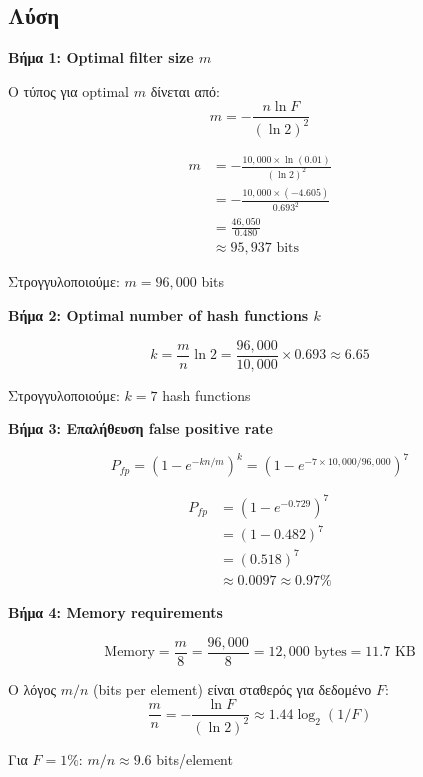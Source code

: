 \subsection*{Λύση}

\textbf{Βήμα 1: Optimal filter size $m$}

Ο τύπος για optimal $m$ δίνεται από:
$$m = -\frac{n \ln F}{(\ln 2)^2}$$

\begin{align*}
m &= -\frac{10{,}000 \times \ln(0.01)}{(\ln 2)^2} \\
&= -\frac{10{,}000 \times (-4.605)}{0.693^2} \\
&= \frac{46{,}050}{0.480} \\
&\approx 95{,}937 \text{ bits}
\end{align*}

Στρογγυλοποιούμε: $m = 96{,}000$ bits

\textbf{Βήμα 2: Optimal number of hash functions $k$}

$$k = \frac{m}{n} \ln 2 = \frac{96{,}000}{10{,}000} \times 0.693 \approx 6.65$$

Στρογγυλοποιούμε: $k = 7$ hash functions

\textbf{Βήμα 3: Επαλήθευση false positive rate}

$$P_{fp} = \left(1 - e^{-kn/m}\right)^k = \left(1 - e^{-7 \times 10{,}000 / 96{,}000}\right)^7$$

\begin{align*}
P_{fp} &= \left(1 - e^{-0.729}\right)^7 \\
&= (1 - 0.482)^7 \\
&= (0.518)^7 \\
&\approx 0.0097 \approx 0.97\%
\end{align*}

\textbf{Βήμα 4: Memory requirements}

$$\text{Memory} = \frac{m}{8} = \frac{96{,}000}{8} = 12{,}000 \text{ bytes} = 11.7 \text{ KB}$$

\begin{infobox}
Ο λόγος $m/n$ (bits per element) είναι σταθερός για δεδομένο $F$:
$$\frac{m}{n} = -\frac{\ln F}{(\ln 2)^2} \approx 1.44 \log_2(1/F)$$

Για $F = 1\%$: $m/n \approx 9.6$ bits/element
\end{infobox}

